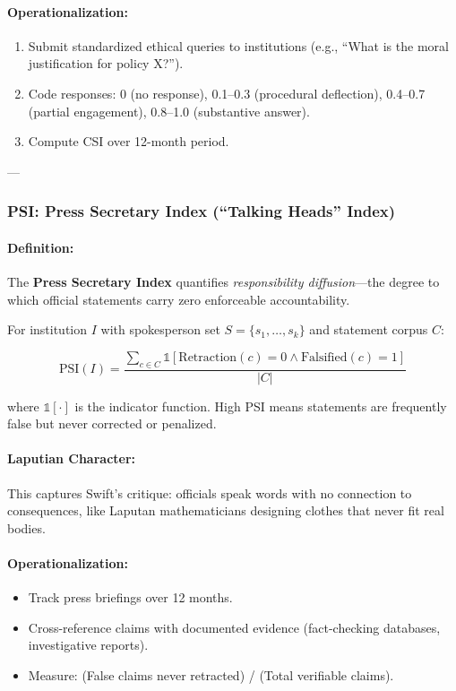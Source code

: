 \documentclass[11pt,a4paper]{article}
\theoremstyle{definition}
\theoremstyle{remark}
\begin{document}
\paragraph{Operationalization:}
\begin{enumerate}
\item Submit standardized ethical queries to institutions (e.g., ``What is the moral justification for policy X?'').
\item Code responses: 0 (no response), 0.1–0.3 (procedural deflection), 0.4–0.7 (partial engagement), 0.8–1.0 (substantive answer).
\item Compute CSI over 12-month period.
\end{enumerate}

---

\subsubsection{PSI: Press Secretary Index (``Talking Heads'' Index)}

\paragraph{Definition:}
The \textbf{Press Secretary Index} quantifies \textit{responsibility diffusion}—the degree to which official statements carry zero enforceable accountability.

For institution $I$ with spokesperson set $S = \{s_1, \dots, s_k\}$ and statement corpus $C$:

\[
\text{PSI}(I) = \frac{\sum_{c \in C} \mathbb{1}[\text{Retraction}(c) = 0 \land \text{Falsified}(c) = 1]}{|C|}
\]

where $\mathbb{1}[\cdot]$ is the indicator function. High PSI means statements are frequently false but never corrected or penalized.

\paragraph{Laputian Character:}
This captures Swift's critique: officials speak words with no connection to consequences, like Laputan mathematicians designing clothes that never fit real bodies.

\paragraph{Operationalization:}
\begin{itemize}
\item Track press briefings over 12 months.
\item Cross-reference claims with documented evidence (fact-checking databases, investigative reports).
\item Measure: (False claims never retracted) / (Total verifiable claims).
\end{itemize}
\end{document}
